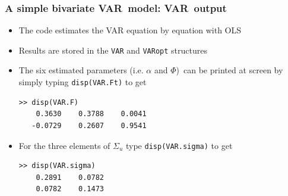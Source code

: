 \documentclass[10pt,english,t,aspectratio=169,ignorenonframetext]{beamer}
\newenvironment{xframe}[1][]
{\begin{frame}[fragile,environment=xframe,#1]}
{\end{frame}}
\begin{document}
\begin{xframe}
\frametitle{A simple bivariate VAR\ model: VAR\ output}\medskip

\begin{itemize}
\item The code estimates the VAR equation by equation with OLS \bigskip\ 

\item Results are stored in the \colorbox{script!80}{\small\texttt{VAR}} and %
\colorbox{script!80}{\small\texttt{VARopt}} structures\bigskip

\item The six estimated parameters (i.e. $\alpha $ and $\Phi $)\ can be
printed at screen by simply typing \colorbox{script!80}{\small%
\texttt{disp(VAR.Ft)}} to get \medskip

\begin{minipage}{\textwidth}
\begin{verbatim}
>> disp(VAR.F)
    0.3630    0.3788    0.0041
   -0.0729    0.2607    0.9541
\end{verbatim}
\end{minipage}

\bigskip

\item For the three elements of $\Sigma _{u}$ type \colorbox{script!80}{%
\small \texttt{disp(VAR.sigma)}} to get \medskip

\begin{minipage}{\textwidth}
\begin{verbatim}
>> disp(VAR.sigma)
    0.2891    0.0782
    0.0782    0.1473
\end{verbatim}
\end{minipage}
\end{itemize}
\end{xframe}

\end{document}
